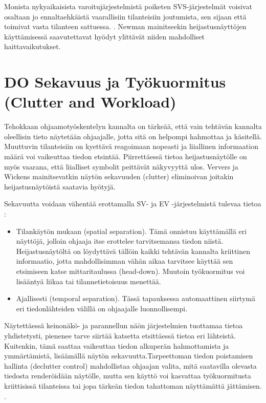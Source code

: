 \documentclass[utf8,bachelor,manualbib]{gradu3}
\begin{document}
Monista nykyaikaisista varoitujärjestelmistä poiketen SVS-järjestelmät voisivat osaltaan jo ennaltaehkäistä vaarallisiin tilanteisiin joutumista, sen sijaan että toimivat vasta tilanteen sattuessa. \citep{schnellym2004}. Newman \citeyearpar{newman2000} mainitseekin heijastusnäyttöjen käyttämisessä saavutettavat hyödyt ylittävät niiden mahdolliset haittavaikutukset.

\section{DO Sekavuus ja Työkuormitus (Clutter and Workload)}

Tehokkaan ohjaamotyöskentelyn kannalta on tärkeää, että vain tehtävän kannalta oleellisin tieto näytetään ohjaajalle, jotta sitä on helpompi hahmottaa ja käsitellä. Muuttuvin tilanteisiin on kyettävä reagoimaan nopeasti ja liiallinen informaation määrä voi vaikeuttaa tiedon etsintää. Piirrettäessä tietoa heijastusnäytölle on myös vaarana, että liialliset symbolit peittävät näkyvyyttä ulos. Ververs ja Wickens \citeyearpar{ververswickens1996} mainitsevatkin näytön sekavuuden (clutter) eliminoivan joitakin heijastusnäytöistä saatavia hyötyjä.

Sekavuutta voidaan vähentää erottamalla SV- ja EV -järjestelmistä tulevaa tietoa \citep{baileyym2007}:

\begin{itemize}
\item Tilankäytön mukaan (spatial separation).
Tämä onnistuu käyttämällä eri näyttöjä, jolloin ohjaaja itse erottelee tarvitsemansa tiedon niistä. Heijastusnäytöltä on löydyttävä tällöin kaikki tehtävän kannalta kriittinen informaatio, jotta mahdollisimman vähän aikaa  tarvitsee käyttää sen etsimiseen katse mittaritaulussa (head-down). Muutoin työkuormitus voi lisääntyä liikaa tai tilannetietoisuus menettää.
\item Ajallisesti (temporal separation).
Tässä tapauksessa automaattinen siirtymä eri tiedonlähteiden välillä on ohjaajalle luonnollisempi.
\end{itemize} 

Näytettäessä keinonäkö- ja parannellun näön järjestelmien tuottamaa tietoa yhdistetysti, pienenee tarve siirtää katsetta etsittäessä tietoa eri lähteistä. Kuitenkin, tämä saattaa vaikeuttaa tiedon alkuperän hahmottamista ja ymmärtämistä, lisäämällä näytön sekavuutta.Tarpeettoman tiedon poistamisen hallinta (declutter control) mahdollistaa ohjaajan valita, mitä saatavilla olevasta tiedosta renderöidään näytölle, mutta sen käyttö voi kasvattaa työkuormitusta kriittisissä tilanteissa tai jopa tärkeän tiedon tahattoman näyttämättä jättämisen. \citep{baileyym2007}.
\end{document}
